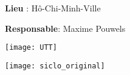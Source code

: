 \documentclass[rapport.tex]{subfiles}
\begin{document}
\begin{titlepage}
\begin{adjustwidth}{0.5cm}{1cm}
{\begin{minipage}[c][4cm]{0.45\textwidth}
        \vspace{0.75cm}

        \textbf{Lieu }: Hô-Chi-Minh-Ville

        \vspace{0.75cm}

        \textbf{Responsable}: Maxime Pouwels

        \vspace{0.75cm}
    \end{minipage}
    }
    \hspace{0.2cm}
    \end{adjustwidth}

    \begin{adjustwidth}{0cm}{0cm}
    \begin{minipage}[b][5cm]{0.5\textwidth}
        \texttt{[image: UTT]}
    \end{minipage}
    \hspace{5cm}
    \begin{minipage}[b][5cm]{0.5\textwidth}
        \texttt{[image: siclo\_original]}
    \end{minipage}
    \end{adjustwidth}
\end{titlepage}
\end{document}
